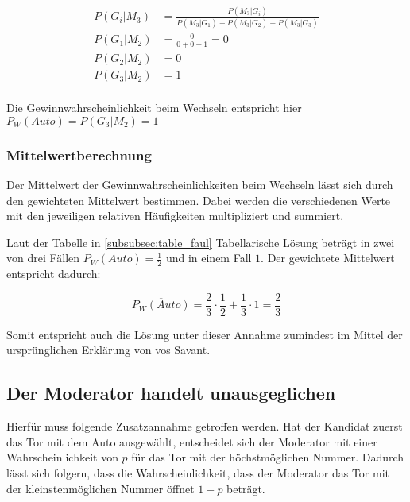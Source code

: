 \begin{align*}
    P(G_i | M_3) & = \frac{P(M_3 | G_i)}{P(M_3 | G_1) + P(M_3 | G_2) + P(M_3 | G_3)} \\
    P(G_1 | M_2) & = \frac{0}{0+0+1} = 0                                             \\
    P(G_2 | M_2) & = 0                                                               \\
    P(G_3 | M_2) & = 1                                                               \\
\end{align*}

Die Gewinnwahrscheinlichkeit beim Wechseln entspricht hier $P_W(Auto) = P(G_3 | M_2) = 1$

\subsubsection{Mittelwertberechnung}

Der Mittelwert der Gewinnwahrscheinlichkeiten beim Wechseln lässt sich durch den gewichteten Mittelwert bestimmen. Dabei werden die verschiedenen Werte mit den jeweiligen relativen Häufigkeiten multipliziert und summiert.

Laut der Tabelle in \ref{subsubsec:table_faul} Tabellarische Lösung beträgt in zwei von drei Fällen $P_W(Auto) = \frac{1}{2}$ und in einem Fall $1$. Der gewichtete Mittelwert entspricht dadurch:

\begin{equation}
    \label{equ:mittelwert_faul}
    \overline{P_W(Auto)} = \frac{2}{3} \cdot \frac{1}{2} + \frac{1}{3} \cdot 1 = \frac{2}{3}
\end{equation}

Somit entspricht auch die Lösung unter dieser Annahme zumindest im Mittel der ursprünglichen Erklärung von vos Savant.


\subsection{Der Moderator handelt unausgeglichen}

Hierfür muss folgende Zusatzannahme getroffen werden. Hat der Kandidat zuerst das Tor mit dem Auto ausgewählt, entscheidet sich der Moderator mit einer Wahrscheinlichkeit von $p$
für das Tor mit der höchstmöglichen Nummer. Dadurch lässt sich folgern, dass die Wahrscheinlichkeit, dass der Moderator das Tor mit der kleinstenmöglichen Nummer öffnet $1 - p$ beträgt.

